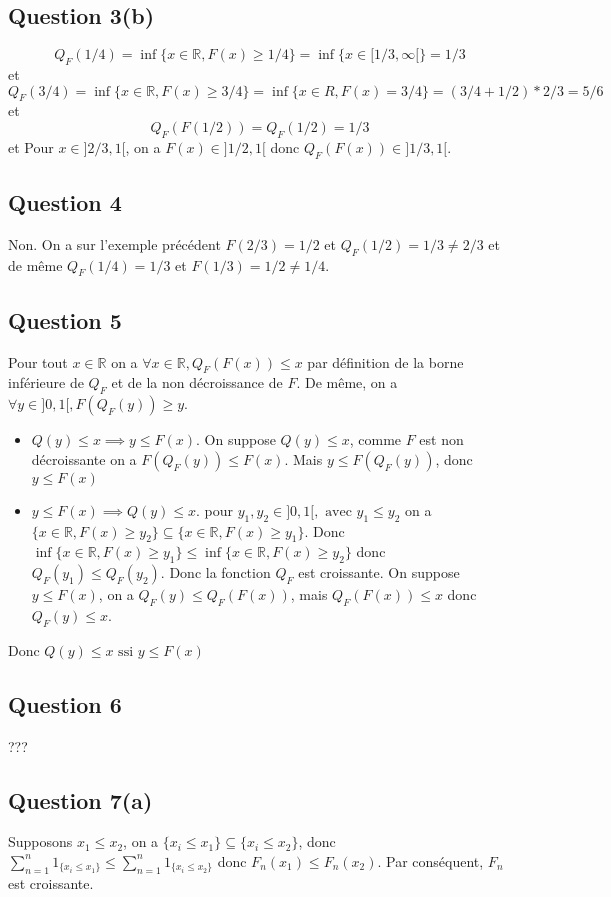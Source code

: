 \documentclass[]{book}
\theoremstyle{definition}
\newcommand{\bb}[1]{\mathbb{#1}}
\newcommand{\R}{\bb{R}}
\begin{document}
\subsection*{Question 3(b)}
$$Q_F(1/4) = \inf\{x \in \R, F(x) \geq 1/4\}= \inf \{ x \in [1/3, \infty[\} = 1/3$$
et
$$Q_F(3/4) = \inf\{x \in \R, F(x) \geq 3/4\}= \inf \{ x \in R, F(x) = 3/4\} = (3/4+1/2)*2/3 = 5/6$$
et
$$Q_F(F(1/2)) = Q_F(1/2) = 1/3$$
et
Pour $x \in ]2/3,1[$, on a $F(x) \in ]1/2,1[$ donc $Q_F(F(x)) \in ]1/3,1[$.

\subsection*{Question 4}
Non. On a sur l'exemple pr\'ec\'edent $F(2/3) = 1/2$ et $Q_F(1/2) = 1/3 \neq 2/3$ et de m\^eme $Q_F(1/4) = 1/3$ et $F(1/3) = 1/2 \neq 1/4$. 

\subsection*{Question 5}
Pour tout $x \in \R$ on a $\forall x \in \R, Q_F(F(x)) \leq x$ par d\'efinition de la borne inf\'erieure de $Q_F$ et de la non d\'ecroissance de $F$. De m\^eme, on a $\forall y \in ]0,1[, F(Q_F(y)) \geq y$. 

\begin{itemize}
\item $Q(y) \leq x \implies y \leq F(x)$. On suppose $Q(y) \leq x$, comme $F$ est non d\'ecroissante on a $F(Q_F(y)) \leq F(x)$. Mais $y \leq F(Q_F(y))$, donc $y \leq F(x)$
\item $y \leq F(x) \implies Q(y) \leq x$. pour $y_1, y_2 \in ]0,1[, \text{ avec } y_1 \leq y_2$ on a $\{x \in \R, F(x) \geq y_2\} \subseteq \{x \in \R, F(x) \geq y_1\}$. 
Donc $\inf \{x \in \R, F(x) \geq y_1\} \leq  \inf \{x \in \R, F(x) \geq y_2\}$ donc $Q_F(y_1) \leq Q_F(y_2)$. Donc la fonction $Q_F$ est croissante. On suppose $y \leq F(x)$, on a $Q_F(y) \leq Q_F(F(x))$, mais $Q_F(F(x)) \leq x$ donc $Q_F(y) \leq x$.
\end{itemize}

Donc $Q(y) \leq x \text{ ssi } y \leq F(x)$

\subsection*{Question 6}
???

\subsection*{Question 7(a)}
Supposons $x_1 \leq x_2$, on a $\{x_i \leq x_1\} \subseteq \{x_i \leq x_2\}$, donc $\sum_{n=1}^n {1_{\{x_i \leq x_1\}}} \leq \sum_{n=1}^n {1_{\{x_i \leq x_2\}}}$ donc $F_n(x_1) \leq F_n(x_2)$. Par cons\'equent, $F_n$ est croissante.
\end{document}

